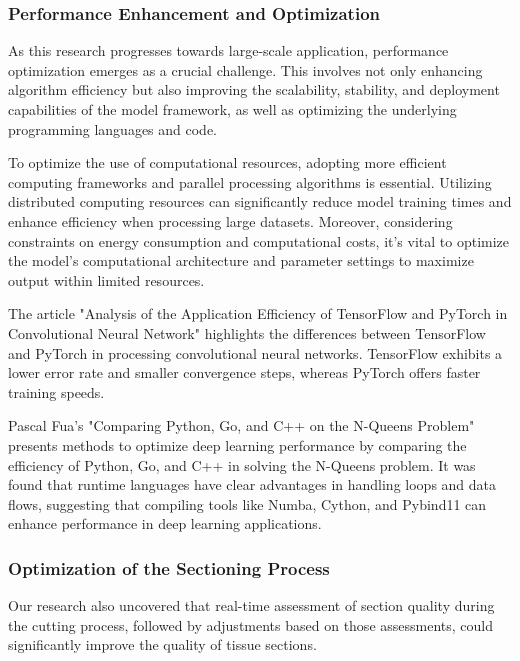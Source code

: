 

\subsubsection{Performance Enhancement and Optimization}

As this research progresses towards large-scale application, performance optimization emerges as a crucial challenge. This involves not only enhancing algorithm efficiency but also improving the scalability, stability, and deployment capabilities of the model framework, as well as optimizing the underlying programming languages and code.

To optimize the use of computational resources, adopting more efficient computing frameworks and parallel processing algorithms is essential. Utilizing distributed computing resources can significantly reduce model training times and enhance efficiency when processing large datasets. Moreover, considering constraints on energy consumption and computational costs, it's vital to optimize the model's computational architecture and parameter settings to maximize output within limited resources.

The article "Analysis of the Application Efficiency of TensorFlow and PyTorch in Convolutional Neural Network" highlights the differences between TensorFlow and PyTorch in processing convolutional neural networks\cite{6.2}. TensorFlow exhibits a lower error rate and smaller convergence steps, whereas PyTorch offers faster training speeds.

Pascal Fua's "Comparing Python, Go, and C++ on the N-Queens Problem" presents methods to optimize deep learning performance by comparing the efficiency of Python, Go, and C++ in solving the N-Queens problem.\cite{6.3} It was found that runtime languages have clear advantages in handling loops and data flows, suggesting that compiling tools like Numba, Cython, and Pybind11 can enhance performance in deep learning applications.


\subsubsection{Optimization of the Sectioning Process}

Our research also uncovered that real-time assessment of section quality during the cutting process, followed by adjustments based on those assessments, could significantly improve the quality of tissue sections.


